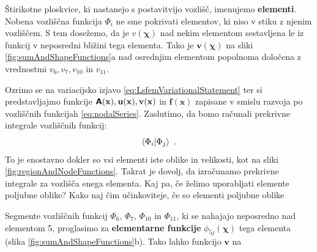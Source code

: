 Štirikotne ploskvice, ki nastanejo s postavitvijo vozlišč, imenujemo \textbf{elementi}. Nobena vozliščna funkcija $\Phi_i$ ne sme pokrivati elementov, ki niso v stiku z njenim vozliščem. S tem dosežemo, da je $v(\bm\chi)$ nad nekim elementom sestavljena le iz funkcij v neposredni bližini tega elementa. Tako je $\mathbf{v}(\bm\chi)$ na sliki \ref{fig:sumAndShapeFunctions}a nad osrednjim elementom popolnoma določena z vrednostmi $v_6, v_7, v_{10}$ in $v_{11}$.

Ozrimo se na variacijsko izjavo \eqref{eq:LsfemVariationalStatement} ter si predstavljajmo funkcije $\bm{\mathsf{A}}(\mathbf{x}), \mathbf{u(x)}, \mathbf{v(x)}$ in $\mathbf{f(x)}$ zapisane v smislu razvoja po vozliščnih funkcijah \eqref{eq:nodalSeries}. Zaslutimo, da bomo računali prekrivne integrale vozliščnih funkcij:
\begin{equation}
   \bra{\Phi_i}\ket{\Phi_j} \ .
\end{equation}
To je enostavno dokler so vsi elementi iste oblike in velikosti, kot na sliki \ref{fig:regionAndNodeFunctions}. Takrat je dovolj, da izračunamo prekrivne integrale za vozlišča enega elementa. Kaj pa, če želimo uporabljati elemente poljubne oblike? Kako naj čim učinkoviteje, če so elementi poljubne oblike

Segmente vozliščnih funkcij $\Phi_6, \, \Phi_7, \, \Phi_{10}$ in $\Phi_{11}$, ki se nahajajo neposredno nad elementom 5, proglasimo za \textbf{elementarne funkcije} $\phi_{5 j}(\bm\chi)$ tega elementa (slika \ref{fig:sumAndShapeFunctions}b). Tako lahko funkcijo $\mathbf{v}$ na

